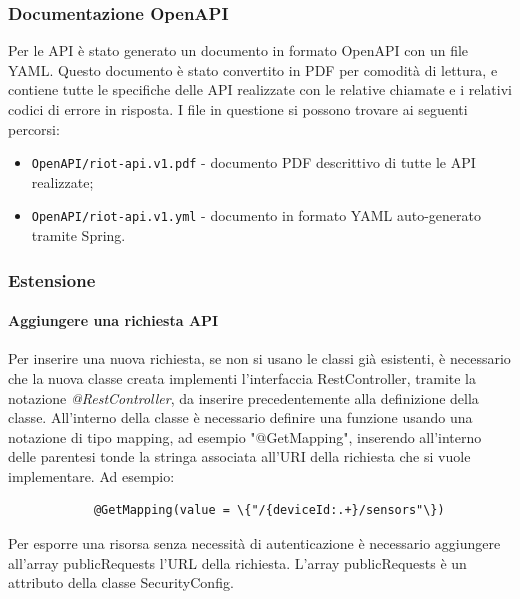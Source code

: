 	\subsubsection{Documentazione OpenAPI}

	Per le API è stato generato un documento in formato OpenAPI con un file YAML. Questo documento è stato convertito in PDF per comodità di lettura, e contiene tutte le specifiche delle API realizzate con le relative chiamate e i relativi codici di errore in risposta.
	\newline
	I file in questione si possono trovare ai seguenti percorsi:
	\begin{itemize}
		\item \verb!OpenAPI/riot-api.v1.pdf! - documento PDF descrittivo di tutte le API realizzate;
		\item \verb!OpenAPI/riot-api.v1.yml! - documento in formato YAML auto-generato tramite Spring.
	\end{itemize}
	
	\subsubsection{Estensione}
		\paragraph{Aggiungere una richiesta API}
			Per inserire una nuova richiesta, se non si usano le classi già esistenti, è necessario che la nuova classe creata implementi l'interfaccia RestController, tramite la notazione \textit{@RestController}, da inserire precedentemente alla definizione della classe.
			\newline
			All'interno della classe è necessario definire una funzione usando una notazione di tipo mapping, ad esempio "@GetMapping", inserendo all'interno delle parentesi tonde la stringa associata all'URI della richiesta che si vuole implementare.
			Ad esempio:
			\begin{verbatim}
			@GetMapping(value = \{"/{deviceId:.+}/sensors"\})
			\end{verbatim}
			Per esporre una risorsa senza necessità di autenticazione è necessario aggiungere all'array publicRequests l'URL della richiesta. L'array publicRequests è un attributo della classe SecurityConfig.
